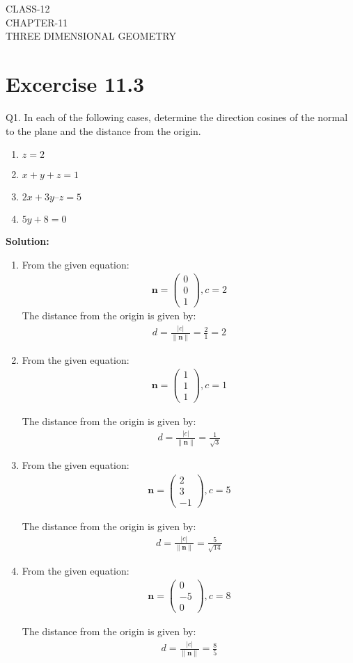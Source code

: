 \documentclass[12pt]{article}
\providecommand{\norm}[1]{\left\lVert#1\right\rVert}
\newcommand{\solution}{\noindent \textbf{Solution: }}
\newcommand{\myvec}[1]{\ensuremath{\begin{pmatrix}#1\end{pmatrix}}}
\let\vec\mathbf
\begin{document}
\begin{center}
\textbf\large{CLASS-12 \\ CHAPTER-11 \\ THREE DIMENSIONAL GEOMETRY}
\end{center}
\section*{Excercise 11.3}

Q1. In each of the following cases, determine the direction cosines of the normal to
the plane and the distance from the origin.
\begin{enumerate}
	\item $z=2$ 
	\item $x + y + z = 1$
	\item $2x + 3y – z = 5$
	\item $5y + 8 = 0$
\end{enumerate}
\solution
\begin{enumerate}
\item From the given equation:
	\begin{align}
		\vec{n}=\myvec{0\\0\\1},c=2
	\end{align}
	The distance from the origin is given by:
		\begin{align}
			d=\frac{|c|}{\norm{\vec{n}}}=\frac{2}{1}=2
		\end{align}

\item From the given equation:
         \begin{align}
		\vec{n}=\myvec{1\\1\\1},c=1
			\end{align}
	 
	The distance from the origin is given by:
		\begin{align}
			d=\frac{|c|}{\norm{\vec{n}}}=\frac{1}{\sqrt{3}}
		\end{align}

\item From the given equation:
         \begin{align}
		\vec{n}=\myvec{2\\3\\-1},c=5
			\end{align}
	
	The distance from the origin is given by:
		\begin{align}
			d=\frac{|c|}{\norm{\vec{n}}}=\frac{5}{\sqrt{14}}
		\end{align}
		
\item From the given equation:
         \begin{align}
		\vec{n}=\myvec{0\\-5\\0},c=8
			\end{align}
	
	The distance from the origin is given by:
		\begin{align}
			d=\frac{|c|}{\norm{\vec{n}}}=\frac{8}{5}
		\end{align}

\end{enumerate}
\end{document}
